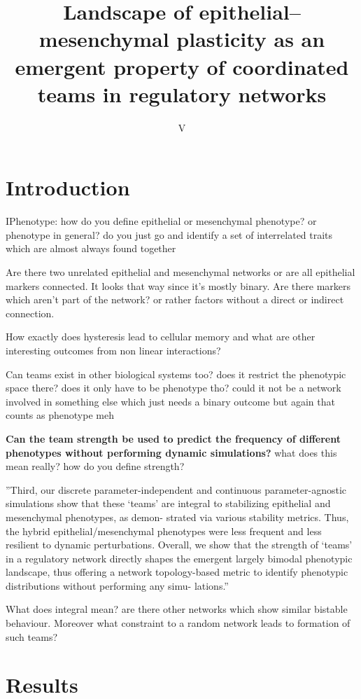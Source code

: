 \documentclass{article}
\title{Landscape of epithelial–mesenchymal
plasticity as an emergent
property of coordinated teams in
regulatory networks}
\author{V}
\begin{document}
\maketitle
\section{Introduction}

IPhenotype: how do you define epithelial or mesenchymal phenotype? or phenotype in general? do you just go and identify a set of interrelated traits which are almost always found together

Are there two unrelated epithelial and mesenchymal networks or are all epithelial markers connected. It looks that way since it's mostly binary. Are there markers which aren't part of the network? or rather factors without a direct or indirect connection.

How exactly does hysteresis lead to cellular memory and what are other interesting outcomes from non linear interactions? 

Can teams exist in other biological systems too? does it restrict the phenotypic space there? does it only have to be phenotype tho? could it not be a network involved in something else which just needs a binary outcome but again that counts as phenotype meh 

\textbf{ Can the team strength be used to predict the frequency of different phenotypes without performing dynamic simulations? } what does this mean really? how do you define strength?

''Third, our discrete parameter-independent and continuous parameter-agnostic simulations
show that these ‘teams’ are integral to stabilizing epithelial and mesenchymal phenotypes, as demon-
strated via various stability metrics. Thus, the hybrid epithelial/mesenchymal phenotypes were less
frequent and less resilient to dynamic perturbations. Overall, we show that the strength of ‘teams’ in a
regulatory network directly shapes the emergent largely bimodal phenotypic landscape, thus offering
a network topology-based metric to identify phenotypic distributions without performing any simu-
lations.''

What does integral mean? are there other networks which show similar bistable behaviour. Moreover what constraint to a random network leads to formation of such teams?

\section{Results}
\end{document}
